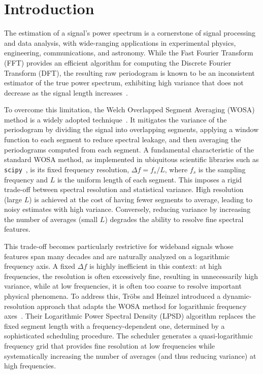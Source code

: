 \documentclass[final, 5p, times, twocolumn, number, sort&compress]{elsarticle}
\newcommand{\sci}{\texttt{scipy}}
\begin{document}
\section{Introduction}
\label{sec:introduction}

The estimation of a signal's power spectrum is a cornerstone of signal processing and data analysis, with wide-ranging applications in experimental physics, engineering, communications, and astronomy. While the Fast Fourier Transform (FFT) provides an efficient algorithm for computing the Discrete Fourier Transform (DFT), the resulting raw periodogram is known to be an inconsistent estimator of the true power spectrum, exhibiting high variance that does not decrease as the signal length increases~\cite{Oppenheim1999}.

To overcome this limitation, the Welch Overlapped Segment Averaging (WOSA) method is a widely adopted technique~\cite{Welch1967}. It mitigates the variance of the periodogram by dividing the signal into overlapping segments, applying a window function to each segment to reduce spectral leakage, and then averaging the periodograms computed from each segment. A fundamental characteristic of the standard WOSA method, as implemented in ubiquitous scientific libraries such as \sci{}~\cite{SciPy}, is its fixed frequency resolution, $\Delta f = f_s/L$, where $f_s$ is the sampling frequency and $L$ is the uniform length of each segment. This imposes a rigid trade-off between spectral resolution and statistical variance. High resolution (large $L$) is achieved at the cost of having fewer segments to average, leading to noisy estimates with high variance. Conversely, reducing variance by increasing the number of averages (small $L$) degrades the ability to resolve fine spectral features.

This trade-off becomes particularly restrictive for wideband signals whose features span many decades and are naturally analyzed on a logarithmic frequency axis. A fixed $\Delta f$ is highly inefficient in this context: at high frequencies, the resolution is often excessively fine, resulting in unnecessarily high variance, while at low frequencies, it is often too coarse to resolve important physical phenomena. To address this, Tr\"obs and Heinzel introduced a dynamic-resolution approach that adapts the WOSA method for logarithmic frequency axes~\cite{Troebs2006}. Their Logarithmic Power Spectral Density (LPSD) algorithm replaces the fixed segment length with a frequency-dependent one, determined by a sophisticated scheduling procedure. The scheduler generates a quasi-logarithmic frequency grid that provides fine resolution at low frequencies while systematically increasing the number of averages (and thus reducing variance) at high frequencies.
\end{document}
